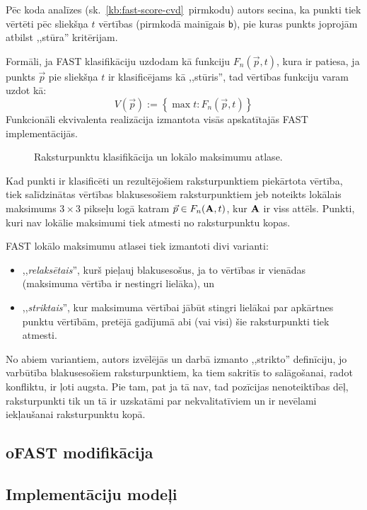Pēc koda analīzes (sk.~\ref{kb:fast-score-cvd}~pirmkodu)
autors secina, ka punkti tiek vērtēti pēc sliekšņa $t$ vērtības
(pirmkodā mainīgais \texttt{b}), pie kuras
punkts joprojām atbilst ,,stūra'' kritērijam.

Formāli, ja FAST klasifikāciju uzdodam kā funkciju $F_n(\vec{p}, t)$,
kura ir patiesa, ja punkts $\vec{p}$ pie sliekšņa $t$ ir klasificējams
kā ,,stūris'', tad vērtības funkciju varam uzdot kā:
\begin{equation}
	V(\vec{p}) := \left\{ \max{t} : F_n(\vec{p}, t) \right\}
\end{equation}
Funkcionāli ekvivalenta realizācija izmantota visās apskatītajās FAST
implementācijās.


\begin{figure}[tbh]
	\centering
	\def\svgwidth{0.8\linewidth}
	{}
	\caption{Raksturpunktu klasifikācija un lokālo maksimumu atlase.}
	\label{fig:nonmax}
\end{figure}

Kad punkti ir klasificēti un rezultējošiem raksturpunktiem piekārtota
vērtība, tiek salīdzinātas vērtības blakusesošiem raksturpunktiem
jeb
noteikts lokālais maksimums $3 \times 3$ pikseļu logā katram
\label{sym:A}
$\vec{p} \in F_n(\mathbf{A}, t)$, kur $\mathbf{A}$ ir viss attēls.
Punkti, kuri nav lokālie maksimumi tiek atmesti no raksturpunktu kopas.

FAST lokālo maksimumu atlasei tiek izmantoti divi varianti:
\begin{itemize}
	\item ,,\emph{relaksētais}'', kurš pieļauj blakusesošus, ja to
		vērtības ir vienādas (maksimuma vērtība ir nestingri lielāka), un
	\item ,,\emph{striktais}'', kur maksimuma vērtībai jābūt stingri
		lielākai par apkārtnes punktu vērtībām, pretējā gadījumā abi (vai
		visi) šie raksturpunkti tiek atmesti.
\end{itemize}
No abiem variantiem, autors izvēlējās un darbā izmanto ,,strikto'' definīciju,
jo varbūtība blakusesošiem raksturpunktiem, ka tiem sakritīs to
 salāgošanai, radot konfliktu, ir ļoti augsta.
Pie tam, pat ja tā nav, tad pozīcijas nenoteiktības dēļ, raksturpunkti tik
un tā ir uzskatāmi par nekvalitatīviem un ir nevēlami iekļaušanai
raksturpunktu kopā.

\subsection{oFAST modifikācija} \label{sec:ofast}
\TODO

\subsection{Implementāciju modeļi} \label{sec:fast-impl}




